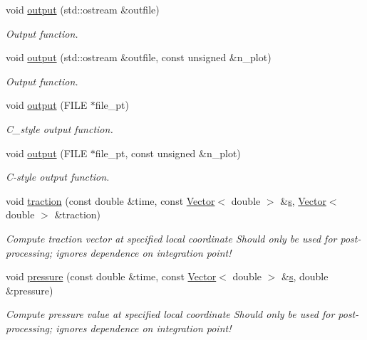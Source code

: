 \begin{DoxyCompactItemize}
void \hyperlink{classoomph_1_1PoroelasticityFaceElement_a9a9f13d76e62d8d7035af1a96804170f}{output} (std\+::ostream \&outfile)
\begin{DoxyCompactList}\small\item\em Output function. \end{DoxyCompactList}\item 
void \hyperlink{classoomph_1_1PoroelasticityFaceElement_af3fd2b11f51ab4c5824e31d0658fd30b}{output} (std\+::ostream \&outfile, const unsigned \&n\+\_\+plot)
\begin{DoxyCompactList}\small\item\em Output function. \end{DoxyCompactList}\item 
void \hyperlink{classoomph_1_1PoroelasticityFaceElement_ad996cd2d792e1d74d4d80950493facf8}{output} (F\+I\+LE $\ast$file\+\_\+pt)
\begin{DoxyCompactList}\small\item\em C\+\_\+style output function. \end{DoxyCompactList}\item 
void \hyperlink{classoomph_1_1PoroelasticityFaceElement_a27547d8d4f375ad212f6108bf1d818f8}{output} (F\+I\+LE $\ast$file\+\_\+pt, const unsigned \&n\+\_\+plot)
\begin{DoxyCompactList}\small\item\em C-\/style output function. \end{DoxyCompactList}\item 
void \hyperlink{classoomph_1_1PoroelasticityFaceElement_a1e82041ba48cda7bc31aa65165cf8208}{traction} (const double \&time, const \hyperlink{classoomph_1_1Vector}{Vector}$<$ double $>$ \&\hyperlink{cfortran_8h_ab7123126e4885ef647dd9c6e3807a21c}{s}, \hyperlink{classoomph_1_1Vector}{Vector}$<$ double $>$ \&traction)
\begin{DoxyCompactList}\small\item\em Compute traction vector at specified local coordinate Should only be used for post-\/processing; ignores dependence on integration point! \end{DoxyCompactList}\item 
void \hyperlink{classoomph_1_1PoroelasticityFaceElement_af0ecc8b5c372d479f9ba46892a21e955}{pressure} (const double \&time, const \hyperlink{classoomph_1_1Vector}{Vector}$<$ double $>$ \&\hyperlink{cfortran_8h_ab7123126e4885ef647dd9c6e3807a21c}{s}, double \&pressure)
\begin{DoxyCompactList}\small\item\em Compute pressure value at specified local coordinate Should only be used for post-\/processing; ignores dependence on integration point! \end{DoxyCompactList}\end{DoxyCompactItemize}
